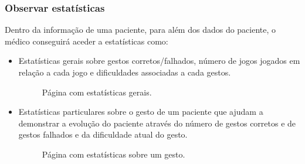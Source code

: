 \documentclass{TTUPhD}
\begin{document}
\subsubsection{Observar estatísticas}

Dentro da informação de uma paciente, para além dos dados do paciente, o médico conseguirá aceder a estatísticas como:

\begin{itemize}
    \item Estatísticas gerais sobre gestos corretos/falhados, número de jogos jogados em relação a cada jogo e dificuldades associadas a cada gestos.
    \begin{figure}[h!]
        \center
        \caption{Página com estatísticas gerais.}
        \label{fig:doctor4}
    \end{figure}
    \item Estatísticas particulares sobre o gesto de um paciente que ajudam a demonstrar a evolução do paciente através do número de gestos corretos e
          de gestos falhados e da dificuldade atual do gesto.
    \begin{figure}[h!]
        \center
        \caption{Página com estatísticas sobre um gesto.}
        \label{fig:doctor3}
    \end{figure}
\end{itemize}
\end{document}
